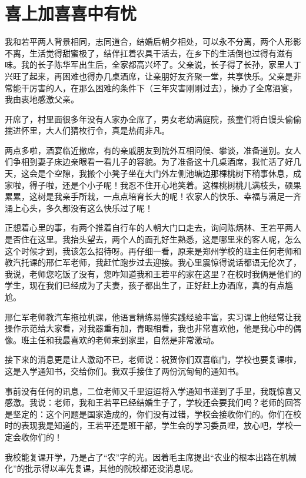 \chapter{喜上加喜\hspace{1em}喜中有忧}

我和若平两人背景相同，志同道合，结婚后朝夕相处，可以永不分离，两个人形影不离，生活觉得甜蜜极了，结伴扛着农具干活去，在乡下的生活倒也过得有滋有味。我的长子陈华军出生后，全家都高兴坏了。父亲说，长子得了长孙，家里人丁兴旺了起来，再困难也得办几桌酒席，让亲朋好友齐聚一堂，共享快乐。父亲是非常能干厉害的人，在那么困难的条件下（三年灾害刚刚过去），操办了全席酒宴，我由衷地感激父亲。

开席了，村里面很多年没有人家办全席了，男女老幼满庭院，孩童们将白馒头偷偷揣进怀里，大人们猜枚行令，真是热闹非凡。

两点多啦，酒宴临近撤席，有的亲戚朋友到院外互相问候、攀谈，准备道别。女人们争相到妻子床边亲眼看一看儿子的容貌。为了准备这十几桌酒席，我忙活了好几天，这会是个空隙，我搬个小凳子坐在大门外左侧池塘边那棵桃树下稍事休息，成家啦，得子啦，还是个小子呢！我忍不住开心地笑着。这棵桃树桃儿满枝头，硕果累累，这树是我亲手所栽，一点点培育长大的呢！农家人的快乐、幸福与满足一齐涌上心头，多久都没有这么快乐过了呢！

正想着心里的事，有两个推着自行车的人朝大门口走去，询问陈炳林、王若平两人是否住在这里。我抬头望去，两个人的面孔好生熟悉，这是哪里来的客人呢，怎么这个时候才到，我该怎么招待呀。再仔细一看，原来是郑州学校的班主任何老师和教汽托课的邢仁军老师，我赶忙跑步过去迎接。我心里震惊得说话都语无伦次了，我说，老师您吃饭了没有，您咋知道我和王若平的家在这里？在校时我俩是他们的学生，现在我们已经成为了夫妻，孩子都出生了，正好赶上办酒席，真的有点尴尬。

邢仁军老师教汽车拖拉机课，他语言精练易懂实践经验丰富，实习课上他经常让我操作示范给大家看，对我器重有加，青眼相看，我也非常喜欢他，他是我心中的偶像。班主任和我最喜欢的老师来到家里，自然是非常激动。

接下来的消息更是让人激动不已，老师说：祝贺你们双喜临门，学校也要复课啦，这是入学通知书，交给你们。我双手接住了两份沉甸甸的通知书。

事前没有任何的讯息，二位老师又千里迢迢将入学通知书递到了手里，我既惊喜又感激。我说：老师，我和王若平已经结婚生子了，学校还会要我们吗？老师的回答是坚定的：这个问题是国家造成的，你们没有过错，学校会接收你们的。你们在校时的表现我是知道的，王若平还是班干部，学生会的学习委员哩，放心吧，学校一定会收你们的！

我校能复课开学，乃是占了“农”字的光。因着毛主席提出“农业的根本出路在机械化”的批示得以率先复课，其他的院校都还没消息呢。


